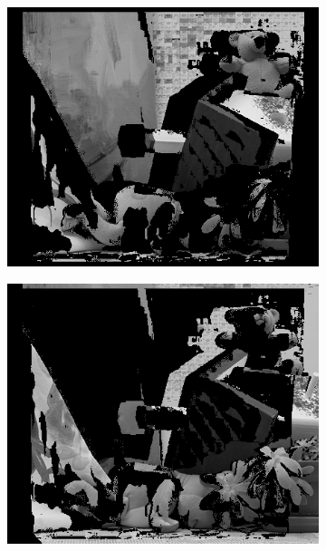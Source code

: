 \documentclass[letterpaper,12pt]{article}
\begin{document}
\begin{figure}[!h]
\begin{subfigure}[b]{0.30\textwidth}
         \end{subfigure}
         \\
        \begin{subfigure}[b]{0.30\textwidth}
                \includegraphics[width=\textwidth]{correct-teddyO.png}

        \end{subfigure}%
        \quad
        \begin{subfigure}[b]{0.30\textwidth}
                \includegraphics[width=\textwidth]{icorrect-teddyO.png}


\end{subfigure}
\end{figure}
\end{document}
